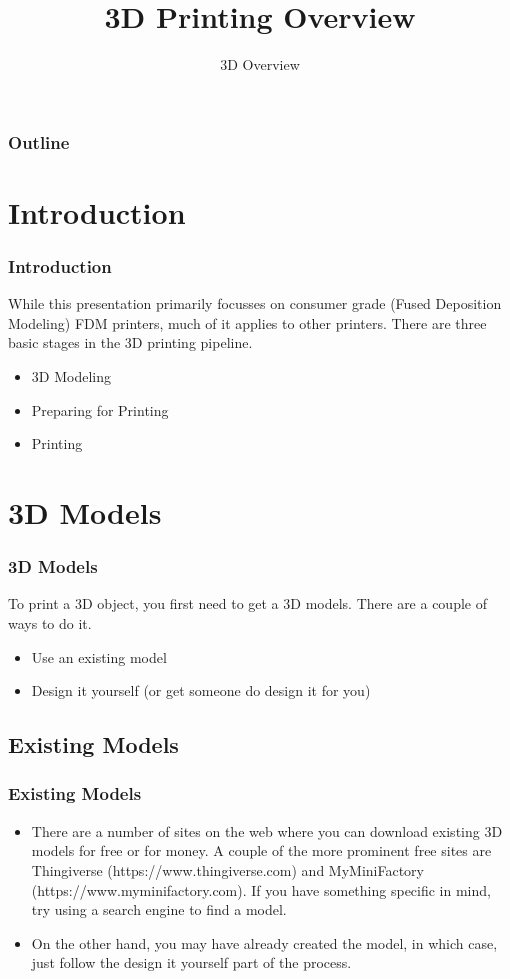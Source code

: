 \documentclass[english,10pt]{beamer}
\title{3D Printing Overview}
\subtitle{3D Overview}
\begin{document}
\begin{frame}
  \titlepage
\end{frame}

\begin{frame}
  \frametitle{Outline}
  \tableofcontents
\end{frame}

\section{Introduction}
\begin{frame}
  \frametitle{Introduction}
  While this presentation primarily focusses on consumer grade (Fused Deposition Modeling) FDM printers, much of it applies to other printers.  There are three basic stages in the 3D printing pipeline.
  \begin{itemize}
    \item 3D Modeling
    \item Preparing for Printing
    \item Printing
  \end{itemize}
\end{frame}

\section{3D Models}
\begin{frame}
  \frametitle{3D Models}
  To print a 3D object, you first need to get a 3D models.  There are a couple of ways to do it.
  \begin{itemize}
    \item Use an existing model
    \item Design it yourself (or get someone do design it for you)
  \end{itemize}
\end{frame}

\subsection{Existing Models}
\begin{frame}
  \frametitle{Existing Models}
  \begin{itemize}
    \item There are a number of sites on the web where you can download existing 3D models for free or for money.  A couple of the more prominent free sites are Thingiverse (https://www.thingiverse.com) and MyMiniFactory (https://www.myminifactory.com).  If you have something specific in mind, try using a search engine to find a model.

    \item  On the other hand, you may have already created the model, in which case, just follow the design it yourself part of the process.
  \end{itemize}
\end{frame}
\end{document}
